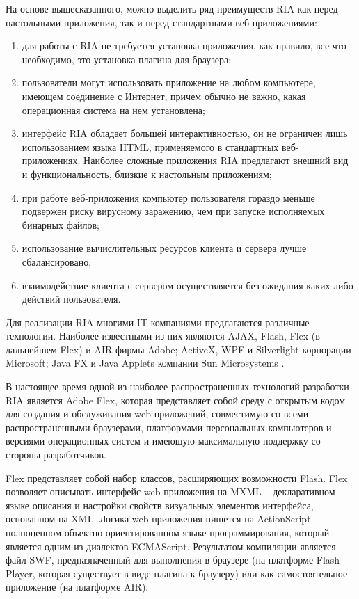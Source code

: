На основе вышесказанного, можно выделить ряд преимуществ RIA как перед настольными приложения,
так и перед стандартными веб-приложениями:

\begin{enumerate}
\item для работы с RIA не требуется установка приложения, как правило, все что необходимо, это установка плагина
для браузера;
\item пользователи могут использовать приложение на любом компьютере, имеющем соединение с Интернет,
причем обычно не важно, какая операционная система на нем установлена;
\item интерфейс RIA обладает большей интерактивностью, он не ограничен лишь использованием языка
HTML, применяемого в стандартных веб-приложениях. Наиболее сложные приложения RIA предлагают 
внешний вид и функциональность, близкие к настольным приложениям;
\item при работе веб-приложения компьютер пользователя гораздо меньше подвержен риску
вирусному заражению, чем при запуске исполняемых бинарных файлов;
\item использование вычислительных ресурсов клиента и сервера лучше сбалансировано;
\item взаимодействие клиента с сервером осуществляется без ожидания каких-либо действий
пользователя.
\end{enumerate}

Для реализации RIA многими IT-компаниями предлагаются различные технологии. Наиболее известными из 
них являются AJAX, Flash, Flex (в дальнейшем Flex) и AIR фирмы Adobe; ActiveX, WPF и Silverlight
корпорации Microsoft; Java FX и Java Applets компании Sun Microsystems .

В настоящее время одной из наиболее распространенных технологий разработки RIA является Adobe Flex,
которая представляет собой среду с открытым кодом для создания и обслуживания web-приложений,
совместимую со всеми распространенными браузерами, платформами персональных компьютеров и версиями
операционных систем и имеющую максимальную поддержку со стороны разработчиков. 

Flex представляет собой набор классов, расширяющих возможности Flash. Flex позволяет описывать
интерфейс web-приложения на MXML – декларативном языке описания и настройки свойств визуальных 
элементов интерфейса, основанном на XML. Логика web-приложения пишется на ActionScript – полноценном
объектно-ориентированном языке программирования, который является одним из диалектов ECMAScript.
Результатом компиляции является файл SWF, предназначенный для выполнения в браузере (на платформе
Flash Player, которая существует в виде плагина к браузеру) или как самостоятельное приложение (на
платформе AIR).

